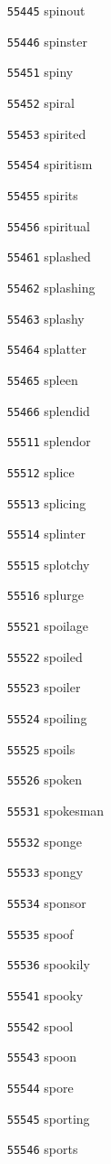 \documentclass[twoside,11pt]{article}
\begin{document}
\begin{multicols}{5}
\begin{enumerate}
\item[\texttt{55445}] spinout
\item[\texttt{55446}] spinster
\item[\texttt{55451}] spiny
\item[\texttt{55452}] spiral
\item[\texttt{55453}] spirited
\item[\texttt{55454}] spiritism
\item[\texttt{55455}] spirits
\item[\texttt{55456}] spiritual
\item[\texttt{55461}] splashed
\item[\texttt{55462}] splashing
\item[\texttt{55463}] splashy
\item[\texttt{55464}] splatter
\item[\texttt{55465}] spleen
\item[\texttt{55466}] splendid
\item[\texttt{55511}] splendor
\item[\texttt{55512}] splice
\item[\texttt{55513}] splicing
\item[\texttt{55514}] splinter
\item[\texttt{55515}] splotchy
\item[\texttt{55516}] splurge
\item[\texttt{55521}] spoilage
\item[\texttt{55522}] spoiled
\item[\texttt{55523}] spoiler
\item[\texttt{55524}] spoiling
\item[\texttt{55525}] spoils
\item[\texttt{55526}] spoken
\item[\texttt{55531}] spokesman
\item[\texttt{55532}] sponge
\item[\texttt{55533}] spongy
\item[\texttt{55534}] sponsor
\item[\texttt{55535}] spoof
\item[\texttt{55536}] spookily
\item[\texttt{55541}] spooky
\item[\texttt{55542}] spool
\item[\texttt{55543}] spoon
\item[\texttt{55544}] spore
\item[\texttt{55545}] sporting
\item[\texttt{55546}] sports

\end{enumerate}
\end{multicols}
\end{document}
